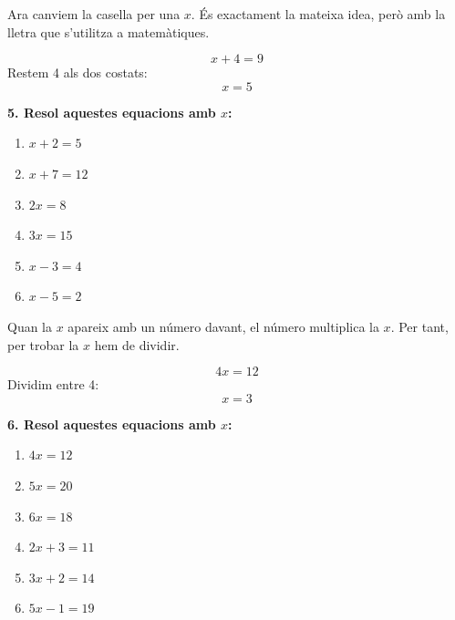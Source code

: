 \documentclass[12pt,a4paper]{article}
\begin{document}
\begin{capsula}
Ara canviem la casella per una $x$. És exactament la mateixa idea, però amb la lletra que s'utilitza a matemàtiques.
\end{capsula}

\begin{exemple}
\[
x + 4 = 9
\]
Restem 4 als dos costats:
\[
x = 5
\]
\end{exemple}

\textbf{5. Resol aquestes equacions amb $x$:}
\begin{enumerate}[label=\alph*)]
    \item $x + 2 = 5$ \vspace{0.8cm}
    \item $x + 7 = 12$ \vspace{0.8cm}
    \item $2x = 8$ \vspace{0.8cm}
    \item $3x = 15$ \vspace{0.8cm}
    \item $x - 3 = 4$ \vspace{0.8cm}
    \item $x - 5 = 2$ \vspace{0.8cm}
\end{enumerate}

\begin{capsula}
Quan la $x$ apareix amb un número davant, el número multiplica la $x$. Per tant, per trobar la $x$ hem de dividir.
\end{capsula}

\begin{exemple}
\[
4x = 12
\]
Dividim entre 4:
\[
x = 3
\]
\end{exemple}

\textbf{6. Resol aquestes equacions amb $x$:}
\begin{enumerate}[label=\alph*)]
    \item $4x = 12$ \vspace{0.8cm}
    \item $5x = 20$ \vspace{0.8cm}
    \item $6x = 18$ \vspace{0.8cm}
    \item $2x + 3 = 11$ \vspace{0.8cm}
    \item $3x + 2 = 14$ \vspace{0.8cm}
    \item $5x - 1 = 19$ \vspace{0.8cm}
\end{enumerate}
\end{document}
